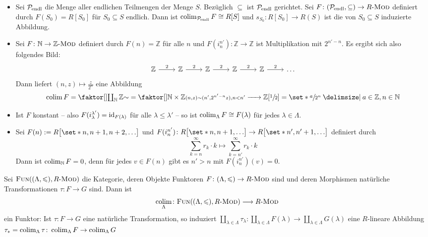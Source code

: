 \begin{beispiel}[{name=[Kolimiten]}]\leavevmode
	\begin{itemize}
		\item Sei $\mathcal{P}\mkern-2.5mu_{\mathrm{endl}}$ die Menge aller endlichen Teilmengen der Menge $S$. 
		Bezüglich $\subseteq$ ist $\mathcal{P}\mkern-2.5mu_{\mathrm{endl}}$ gerichtet.
		Sei $F \colon \enbrace*{\mathcal{P}\mkern-2.5mu_{\mathrm{endl}},\subseteq} \to R\text{-}\MOD$ definiert durch $F(S_0)=R[S_0]$ für $S_0 \subseteq S$ endlich. 
		Dann ist $\operatorname*{colim}_{\mathcal{P}\mkern-2.5mu_{\mathrm{endl}}} F \cong R[S]$ und $s_{S_0} \colon R[S_0]\to R(S)$ ist die von $S_0 \subseteq S$ induzierte Abbildung.
		\item Sei $F \colon \mathbb{N} \to \mathbb{Z}\text{-}\textsc{Mod}$ definiert durch $F(n)=\mathbb{Z}$ für alle $n$ und $F(i_n^{n'}) \colon \mathbb{Z} \to \mathbb{Z}$ ist Multiplikation mit $2^{n'-n}$. 
		Es ergibt sich also folgendes Bild:
		\[
			\begin{tikzcd}
				\mathbb{Z} \rar["2"] & \mathbb{Z} \rar["2"] & \mathbb{Z} \rar["2"] &\mathbb{Z} \rar["2"] & \mathbb{Z} \rar["2"] & \ldots 
			\end{tikzcd}
		\]
		Dann liefert $(n,z) \mapsto \frac{z}{2^n}$ eine Abbildung
		\[
			\colim F = \Faktor{\coprod_{\mathbb{N}} \mathbb{Z}}{\sim} = \Faktor{\mathbb{N}\times \mathbb{Z}}{\scriptstyle(n,z) \sim (n',2^{n'-n} z), n < n'} \grenzw{} \mathbb{Z}\benbrace*{\sfrac{1}{2}} = \set*{\sfrac{a}{2^n}\given a \in \mathbb{Z}, n \in \mathbb{N} }
		\]
		\item Ist $F$ konstant -- also $F(i_\lambda^{\lambda'})=\operatorname{id}_{F(\lambda)}$ für alle $\lambda \le \lambda'$ -- so ist 
		\(
			\operatorname*{colim}_\Lambda F \cong F(\lambda)
		\)
		für jedes $\lambda \in \Lambda$.
		\item Sei $F(n) := R \benbrace[\big]{\set*{n,n+1,n+2,\ldots }}$ und $F(i_n^{n'}) \colon R \benbrace[\big]{\set*{n,n+1,\ldots }} \to R \benbrace[\big]{\set*{n',n'+1,\ldots }}$ definiert durch 
		\[
			\sum_{k=n}^{\infty} r_k \cdot k \longmapsto \sum_{k=n'}^{\infty} r_k \cdot k
		\]
		Dann ist $\operatorname*{colim}_\mathbb{N} F = 0$, denn für jedes $v \in F(n)$ gibt es $n'> n$ mit $F(i_n^{n'})(v)=0$.
	\end{itemize}
\end{beispiel}

\begin{bemerkung}[{name=[gerichteter Limes als Funktor]}]
	Sei $\FUN\enbrace*{(\Lambda,\le), R\text{-}\MOD}$ die Kategorie, deren Objekte Funktoren $F \colon (\Lambda,\leqslant) \to R \text{-}\textsc{Mod}$ sind und deren Morphismen natürliche Transformationen $\tau \colon F \to G$ sind. Dann ist
	\[
		\colim_\Lambda \colon \FUN\enbrace*{(\Lambda,\le), R\text{-}\MOD} \longrightarrow R\text{-}\MOD
	\]
	ein Funktor: Ist $\tau \colon F \to G$ eine natürliche Transformation, so induziert $\coprod_{\lambda \in \Lambda}\tau_\lambda \colon \coprod_{\lambda \in \Lambda} F(\lambda) \to \coprod_{\lambda \in \Lambda} G(\lambda)$ eine $R$-lineare Abbildung $\tau_* =\operatorname*{colim}_\Lambda \tau \colon \operatorname*{colim}_\Lambda F \to \operatorname*{colim}_\Lambda G$
\end{bemerkung}


